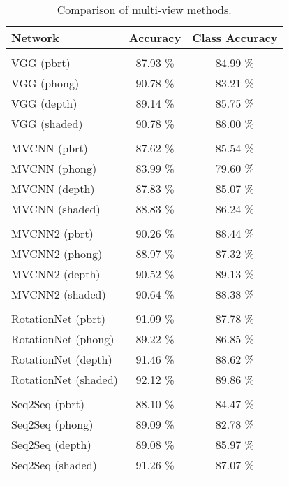 \begin{table}[]
	\centering
	\begin{tabular}{lcc}
		\hline
		\textbf{Network}     & \textbf{Accuracy} & \textbf{Class Accuracy } \\ \hline
		                     &                   &                         \\
		VGG (pbrt)           &     87.93 \%      &        84.99 \%         \\
		VGG (phong)          &     90.78 \%      &        83.21 \%         \\
		VGG (depth)          &     89.14 \%      &        85.75 \%         \\
		VGG (shaded)         &     90.78 \%      &        88.00 \%         \\
		                     &                   &                         \\
		MVCNN (pbrt)         &     87.62 \%      &        85.54 \%         \\
		MVCNN (phong)        &     83.99 \%      &        79.60 \%         \\
		MVCNN (depth)        &     87.83 \%      &        85.07 \%         \\
		MVCNN (shaded)       &     88.83 \%      &        86.24 \%         \\
		                     &                   &                         \\
		MVCNN2 (pbrt)        &     90.26 \%      &        88.44 \%         \\
		MVCNN2 (phong)       &     88.97 \%      &        87.32 \%         \\
		MVCNN2 (depth)       &     90.52 \%      &        89.13 \%         \\
		MVCNN2 (shaded)      &     90.64 \%      &        88.38 \%         \\
		                     &                   &                         \\
		RotationNet (pbrt)   &     91.09 \%      &        87.78 \%         \\
		RotationNet (phong)  &     89.22 \%      &        86.85 \%         \\
		RotationNet (depth)  &     91.46 \%      &        88.62 \%         \\
		RotationNet (shaded) &     92.12 \%      &        89.86 \%         \\
		                     &                   &                         \\
		Seq2Seq  (pbrt)      &     88.10 \%      &        84.47 \%         \\
		Seq2Seq  (phong)     &     89.09 \%      &        82.78 \%         \\
		Seq2Seq  (depth)     &     89.08 \%      &        85.97 \%         \\
		Seq2Seq  (shaded)    &     91.26 \%      &        87.07 \%         \\
		                     &                   &                         \\ \hline
	\end{tabular}
\caption{Comparison of multi-view methods.}
\label{Table:mv}
\end{table}